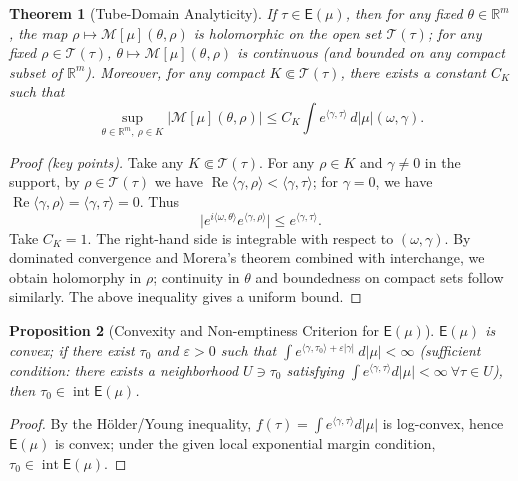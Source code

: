 \documentclass[11pt,a4paper]{article}
\newtheorem{theorem}{Theorem}[section]
\newtheorem{proposition}[theorem]{Proposition}
\theoremstyle{remark}
\DeclareMathOperator{\Re}{Re}
\DeclareMathOperator{\Int}{int}
\begin{document}
\begin{theorem}[Tube-Domain Analyticity]\label{thm:tube}
If $\tau\in\mathsf{E}(\mu)$, then for any fixed $\theta\in\mathbb{R}^m$, the map $\rho\mapsto\mathcal{M}[\mu](\theta,\rho)$ is holomorphic on the open set $\mathcal{T}(\tau)$; for any fixed $\rho\in\mathcal{T}(\tau)$, $\theta\mapsto\mathcal{M}[\mu](\theta,\rho)$ is continuous (and bounded on any compact subset of $\mathbb{R}^m$). Moreover, for any compact $K\Subset\mathcal{T}(\tau)$, there exists a constant $C_K$ such that
\begin{equation}
\sup_{\theta\in\mathbb{R}^m,\ \rho\in K}|\mathcal{M}[\mu](\theta,\rho)|
\le C_K\int e^{\langle\gamma,\tau\rangle}\,d|\mu|(\omega,\gamma).
\end{equation}
\end{theorem}

\begin{proof}[Proof (key points)]
Take any $K\Subset\mathcal{T}(\tau)$. For any $\rho\in K$ and $\gamma\ne 0$ in the support, by $\rho\in\mathcal{T}(\tau)$ we have $\Re\langle\gamma,\rho\rangle<\langle\gamma,\tau\rangle$; for $\gamma=0$, we have $\Re\langle\gamma,\rho\rangle=\langle\gamma,\tau\rangle=0$. Thus
\begin{equation}
\bigl|e^{i\langle\omega,\theta\rangle}e^{\langle\gamma,\rho\rangle}\bigr|\le e^{\langle\gamma,\tau\rangle}.
\end{equation}
Take $C_K=1$. The right-hand side is integrable with respect to $(\omega,\gamma)$. By dominated convergence and Morera's theorem combined with interchange, we obtain holomorphy in $\rho$; continuity in $\theta$ and boundedness on compact sets follow similarly. The above inequality gives a uniform bound.
\end{proof}

\begin{proposition}[Convexity and Non-emptiness Criterion for $\mathsf{E}(\mu)$]\label{prop:convex}
$\mathsf{E}(\mu)$ is convex; if there exist $\tau_0$ and $\varepsilon>0$ such that $\int e^{\langle\gamma,\tau_0\rangle+\varepsilon|\gamma|}\ d|\mu|<\infty$ (sufficient condition: there exists a neighborhood $U\ni\tau_0$ satisfying $\int e^{\langle\gamma,\tau\rangle}d|\mu|<\infty\ \forall\tau\in U$), then $\tau_0\in\Int\mathsf{E}(\mu)$.
\end{proposition}

\begin{proof}
By the H\"older/Young inequality, $f(\tau)=\int e^{\langle\gamma,\tau\rangle}d|\mu|$ is log-convex, hence $\mathsf{E}(\mu)$ is convex; under the given local exponential margin condition, $\tau_0\in\Int\mathsf{E}(\mu)$.
\end{proof}
\end{document}
